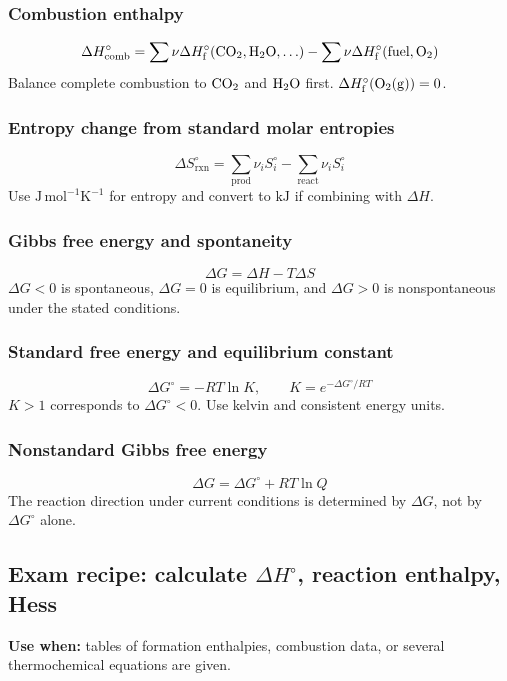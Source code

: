 \subsubsection{Combustion enthalpy}
\[
\Delta H^\circ_{\mathrm{comb}}
=\sum\nu\Delta H^\circ_{\mathrm f}(\ce{CO2},\ce{H2O},\ldots)
-\sum\nu\Delta H^\circ_{\mathrm f}(\text{fuel},\ce{O2})
\]
Balance complete combustion to \(\ce{CO2}\) and \(\ce{H2O}\) first. \(\Delta H^\circ_{\mathrm f}(\ce{O2(g)})=0\).

\subsubsection{Entropy change from standard molar entropies}
\[
\Delta S^\circ_{\mathrm{rxn}}=
\sum_{\mathrm{prod}}\nu_iS^\circ_i-\sum_{\mathrm{react}}\nu_iS^\circ_i
\]
Use \(\mathrm{J\,mol^{-1}K^{-1}}\) for entropy and convert to \(\mathrm{kJ}\) if combining with \(\Delta H\).

\subsubsection{Gibbs free energy and spontaneity}
\[
\Delta G=\Delta H-T\Delta S
\]
\(\Delta G<0\) is spontaneous, \(\Delta G=0\) is equilibrium, and \(\Delta G>0\) is nonspontaneous under the stated conditions.

\subsubsection{Standard free energy and equilibrium constant}
\[
\Delta G^\circ=-RT\ln K, \qquad K=e^{-\Delta G^\circ/RT}
\]
\(K>1\) corresponds to \(\Delta G^\circ<0\). Use kelvin and consistent energy units.

\subsubsection{Nonstandard Gibbs free energy}
\[
\Delta G=\Delta G^\circ+RT\ln Q
\]
The reaction direction under current conditions is determined by \(\Delta G\), not by \(\Delta G^\circ\) alone.

\subsection{Exam recipe: calculate \(\Delta H^\circ\), reaction enthalpy, Hess}
\textbf{Use when:} tables of formation enthalpies, combustion data, or several thermochemical equations are given.

